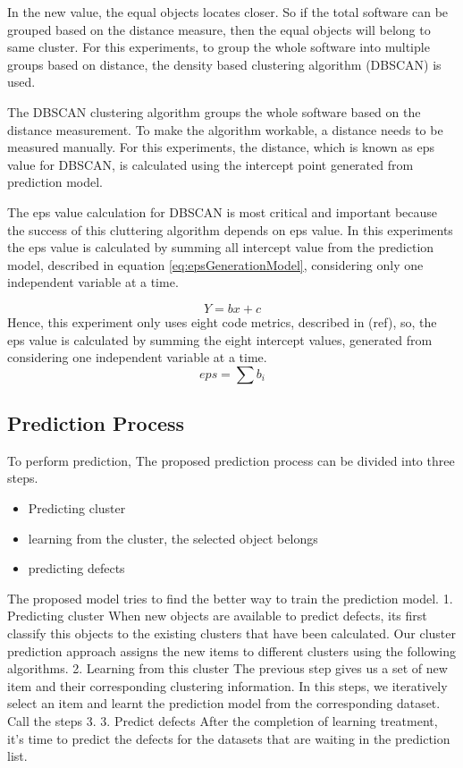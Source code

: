 \documentclass[12pt]{report}
\begin{document}
In the new value, the equal objects locates closer. So if the total software can be grouped based on the distance measure, then the equal objects will belong to same cluster. For this experiments, to group the whole software into multiple groups based on distance, the density based clustering algorithm (DBSCAN) is used.
 
The DBSCAN clustering algorithm groups the whole software based on the distance measurement. To make the algorithm workable, a distance needs to be measured manually. For this experiments, the distance, which is known as eps value for DBSCAN, is calculated using the intercept point generated from prediction model.

The eps value calculation for DBSCAN is most critical and important because the success of this cluttering algorithm depends on eps value. In this experiments the eps value is calculated by summing all intercept value from the prediction model, described in equation \ref{eq:epsGenerationModel}, considering only one independent variable at a time. 

\begin{equation}
\label{eq:epsGenerationModel}
 Y=bx+c
\end{equation}
Hence, this experiment only uses eight code metrics, described in (ref{}), so, the eps value is calculated by summing the eight intercept values, generated from considering one independent variable at a time.  
\begin{equation}
\label{eq:totalepsCalculation}
 eps=\sum{b_{i}}
\end{equation}
\subsection{Prediction Process}

To perform prediction, 
The proposed prediction process can be divided into three steps.

\begin{itemize}
	\item Predicting cluster
	\item learning from the cluster, the selected object belongs
	\item predicting defects
\end{itemize}
The proposed model tries to find the better way to train the prediction model. 
1.	Predicting cluster
When new objects are available to predict defects, its first classify this objects to the existing clusters that have been calculated. Our cluster prediction approach assigns the new items to different clusters using the following algorithms.  
2.	Learning from this cluster
The previous step gives us a set of new item and their corresponding clustering information. In this steps, we iteratively select an item and learnt the prediction model from the corresponding dataset. Call the steps 3. 
3.	Predict defects
After the completion of learning treatment, it’s time to predict the defects for the datasets that are waiting in the prediction list. 
\end{document}
